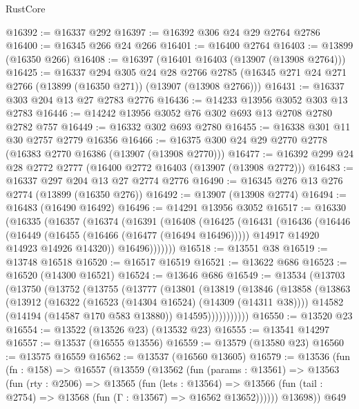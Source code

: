 \begin{lexlean}{RustCore}
\begin{coremodule}
@16392 := @16337 @292
@16397 := @16392 @306 @24 @29 @2764 @2786
@16400 := @16345 @266 @24 @266
@16401 := @16400 @2764
@16403 := @13899 (@16350 @266)
@16408 := @16397 (@16401 @16403 (@13907 (@13908 @2764)))
@16425 := @16337
    @294
    @305
    @24
    @28
    @2766
    @2785
    (@16345 @271 @24 @271 @2766 (@13899 (@16350 @271)) (@13907 (@13908 @2766)))
@16431 := @16337 @303 @204 @13 @27 @2783 @2776
@16436 := @14233 @13956 @3052 @303 @13 @2783
@16446 := @14242 @13956 @3052 @76 @302 @693 @13 @2708 @2780 @2782 @757
@16449 := @16332 @302 @693 @2780
@16455 := @16338 @301 @11 @30 @2757 @2779 @16356
@16466 := @16375 @300 @24 @29 @2770 @2778 (@16383 @2770 @16386 (@13907 (@13908 @2770)))
@16477 := @16392 @299 @24 @28 @2772 @2777 (@16400 @2772 @16403 (@13907 (@13908 @2772)))
@16483 := @16337 @297 @204 @13 @27 @2774 @2776
@16490 := @16345 @276 @13 @276 @2774 (@13899 (@16350 @276))
@16492 := @13907 (@13908 @2774)
@16494 := @16483 (@16490 @16492)
@16496 := @14291 @13956 @3052
@16517 := @16330
    (@16335
      (@16357
        (@16374
          (@16391
            (@16408
              (@16425
                (@16431
                  (@16436
                    (@16446
                      (@16449 (@16455 (@16466 (@16477 (@16494 @16496)))))
                      @14917
                      @14920
                      @14923
                      @14926
                      @14320))
                  @16496)))))))
@16518 := @13551 @38
@16519 := @13748 @16518
@16520 := @16517 @16519
@16521 := @13622 @686
@16523 := @16520 (@14300 @16521)
@16524 := @13646 @686
@16549 := @13534
    (@13703
      (@13750
        (@13752
          (@13755
            (@13777
              (@13801
                (@13819
                  (@13846
                    (@13858
                      (@13863
                        (@13912
                          (@16322 (@16523 (@14304 @16524) (@14309 (@14311 @38))))
                          @14582
                          (@14194 (@14587 @170 @583 @13880))
                          @14595)))))))))))
@16550 := @13520 @23
@16554 := @13522 (@13526 @23) (@13532 @23)
@16555 := @13541 @14297
@16557 := @13537 (@16555 @13556)
@16559 := @13579 (@13580 @23)
@16560 := @13575 @16559
@16562 := @13537 (@16560 @13605)
@16579 := @13536
    (fun (fn : @158) =>
    @16557
      (@13559
        (@13562
          (fun (params : @13561) =>
          @13563
            (fun (rty : @2506) =>
            @13565
              (fun (lets : @13564) =>
              @13566 (fun (tail : @2754) => @13568 (fun (Γ : @13567) => @16562 @13652))))))
        @13698))
    @649

\end{coremodule}
\end{lexlean}

